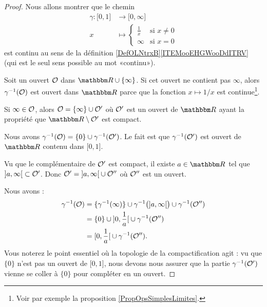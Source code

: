 \begin{proof}
    Nous allons montrer que le chemin
    \begin{equation}
        \begin{aligned}
            \gamma\colon \mathopen[ 0 , 1 \mathclose]&\to \mathopen[ 0 , \infty \mathclose] \\
            x&\mapsto \begin{cases}
                \frac{1}{ x }    &   \text{si } x\neq 0\\
                \infty    &    \text{si } x=0
            \end{cases}
        \end{aligned}
    \end{equation}
    est continu au sens de la définition \ref{DefOLNtrxB}\ref{ITEMooEHGWooDdITRV} (qui est le seul sens possible au mot «continu»).

    Soit un ouvert \( \mathcal{O}\) dans \( \eR\cup\{ \infty \}\). Si cet ouvert ne contient pas \( \infty\), alors \( \gamma^{-1}(\mathcal{O})\) est ouvert dans \( \eR\) parce que la fonction \( x\mapsto 1/x\) est continue\footnote{Voir par exemple la proposition \ref{PropOpsSimplesLimites}.}.

    Si \( \infty\in\mathcal{O}\), alors \( \mathcal{O}=\{ \infty \}\cup \mathcal{O}'\) où \( \mathcal{O}'\) est un ouvert de \( \eR\) ayant la propriété que \( \eR\setminus \mO'\) est compact.

    Nous avons \( \gamma^{-1}(\mathcal{O})=\{ 0 \}\cup\gamma^{-1}(\mathcal{O}')\). Le fait est que \( \gamma^{-1}(\mathcal{O}')\) est ouvert de \( \eR\) contenu dans \( \mathopen[ 0 , 1 \mathclose]\).

Vu que le complémentaire de \( \mathcal{O}'\) est compact, il existe \( a\in \eR\) tel que \( \mathopen] a , \infty \mathclose[\subset \mathcal{O}'\). Donc \( \mathcal{O}'=\mathopen] a , \infty \mathclose[\cup\mathcal{O}''\) où \( \mathcal{O}''\) est un ouvert.

    Nous avons :
    \begin{subequations}
        \begin{align}
        \gamma^{-1}(\mathcal{O})&=\{ \gamma^{-1}(\infty) \}\cup \gamma^{-1}\big( \mathopen] a , \infty \mathclose[ \big)\cup \gamma^{-1}(\mathcal{O}'')\\
        &=\{ 0 \}\cup\mathopen] 0 , \frac{1}{  a } \mathclose[\cup\gamma^{-1}(\mathcal{O}'')\\
            &=\mathopen[ 0 , \frac{1}{ a } \mathclose[\cup\gamma^{-1}(\mathcal{O}'').
        \end{align}
    \end{subequations}
    Vous noterez le point essentiel où la topologie de la compactification agit : vu que \( \{0\}\) n'est pas un ouvert de \( \mathopen[ 0 , 1 \mathclose]\), nous devons nous assurer que la partie \( \gamma^{-1}(\mathcal{O}')\) vienne se coller à \( \{0\}\) pour compléter en un ouvert.


\end{proof}
